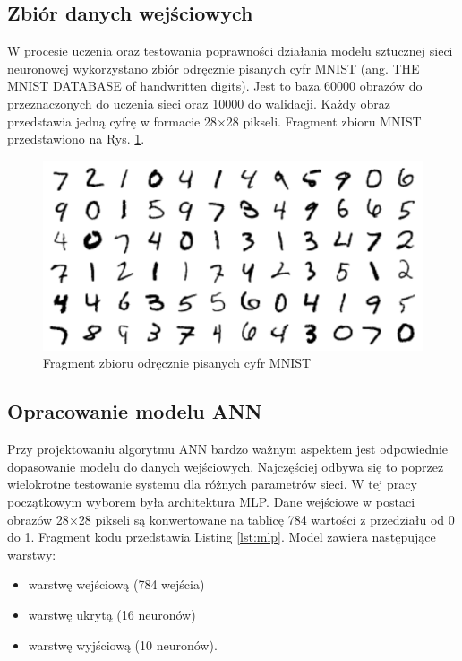 \subsection{Zbiór danych wejściowych}

W procesie uczenia oraz testowania poprawności działania modelu sztucznej 
sieci neuronowej wykorzystano zbiór odręcznie pisanych cyfr MNIST 
(ang. THE MNIST DATABASE of handwritten digits)\cite{lecun-mnisthandwrittendigit-2010}. Jest to baza 60000 obrazów do 
przeznaczonych do uczenia sieci oraz 10000 do walidacji. Każdy obraz przedstawia jedną cyfrę w formacie 28$\times$28 pikseli. 
Fragment zbioru MNIST przedstawiono na Rys. \ref{mnist-set}.

\begin{figure}[!h]
  \centering
  \includegraphics[width=\textwidth]{img/mnist.png}
  \caption{Fragment zbioru odręcznie pisanych cyfr MNIST \cite{lecun-mnisthandwrittendigit-2010}}
  \label{mnist-set}
\end{figure}

\subsection{Opracowanie modelu ANN}

Przy projektowaniu algorytmu ANN bardzo ważnym aspektem jest odpowiednie dopasowanie modelu do danych wejściowych. 
Najczęściej odbywa się to poprzez wielokrotne testowanie systemu dla różnych parametrów sieci. W tej pracy początkowym 
wyborem była architektura MLP. Dane wejściowe w postaci obrazów 28$\times$28 pikseli są konwertowane na tablicę 784 wartości z przedziału od 0 do 1. Fragment kodu przedstawia Listing \ref{lst:mlp}. Model zawiera następujące warstwy:
\begin{itemize}
  \item warstwę wejściową (784 wejścia)
  \item warstwę ukrytą (16 neuronów)
  \item warstwę wyjściową (10 neuronów).
\end{itemize}

